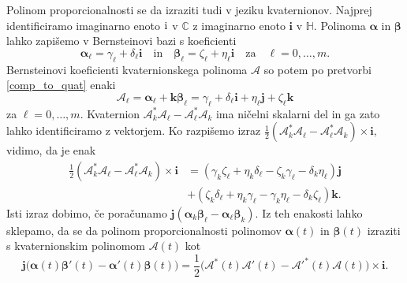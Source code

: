 \documentclass[12pt,a4paper,twoside]{article}
\newcommand{\iu}{\mathrm{i}\mkern1mu} %
\theoremstyle{definition} %
\theoremstyle{plain} %
\theoremstyle{primerstyle}
\numberwithin{equation}{section}  %
\renewcommand{\C}{\mathbb C}
\newcommand{\quat}{\mathbb H}
\newcommand{\iV}{\mathbf{i}}
\newcommand{\jV}{\mathbf{j}}
\newcommand{\kV}{\mathbf{k}}
\newcommand{\AQ}{\mathcal{A}}
\newcommand{\balpha}{\boldsymbol \alpha}
\newcommand{\bbeta}{\boldsymbol \beta}
\begin{document}
Polinom proporcionalnosti se da izraziti tudi v jeziku kvaternionov. Najprej identificiramo imaginarno enoto $\iu$ v $\C$ z imaginarno enoto $\iV$ v $\quat.$ Polinoma $\balpha$ in $\bbeta$ lahko zapišemo v Bernsteinovi bazi s koeficienti
\begin{equation*}
	\balpha_\ell=\gamma_\ell+\delta_\ell\iV\quad\text{in}\quad\bbeta_\ell=\zeta_\ell+\eta_\ell\iV\quad\text{za}\quad \ell=0,\dots,m.
\end{equation*}
Bernsteinovi koeficienti kvaternionskega polinoma $\AQ$ so potem po pretvorbi \eqref{comp_to_quat} enaki
\begin{equation*}
	\AQ_\ell=\balpha_\ell+\kV\bbeta_\ell=\gamma_\ell+\delta_\ell\iV+\eta_\ell\jV+\zeta_\ell\kV
\end{equation*}
za $\ell=0,\dots,m.$ Kvaternion $\AQ_k^*\AQ_\ell-\AQ_\ell^*\AQ_k$ ima ničelni skalarni del in ga zato lahko identificiramo z vektorjem. Ko razpišemo izraz $\frac{1}{2}(\AQ_k^*\AQ_\ell-\AQ_\ell^*\AQ_k)\times\iV,$ vidimo, da je enak
\begin{align*}
	\frac{1}{2}(\AQ_k^*\AQ_\ell-\AQ_\ell^*\AQ_k)\times\iV&=(\gamma_k\zeta_\ell+\eta_k\delta_\ell-\zeta_k\gamma_\ell-\delta_k\eta_\ell)\jV\\
	&+(\zeta_k\delta_\ell+\eta_k\gamma_\ell-\gamma_k\eta_\ell-\delta_k\zeta_\ell)\kV.
\end{align*}
Isti izraz dobimo, če poračunamo $\jV(\balpha_k\bbeta_\ell-\balpha_\ell\bbeta_k).$ Iz teh enakosti lahko sklepamo, da se da polinom proporcionalnosti polinomov $\balpha(t)$ in $\bbeta(t)$ izraziti s kvaternionskim polinomom $\AQ(t)$ kot
\begin{equation}
	\label{propor_kot_quat}
	\jV\big(\balpha(t)\bbeta'(t)-\balpha'(t)\bbeta(t)\big)=\frac{1}{2}\big(\AQ^*(t)\AQ'(t)-\AQ'^*(t)\AQ(t)\big)\times\iV.
\end{equation}
\end{document}
